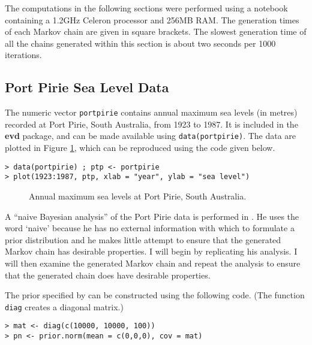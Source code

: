 \documentclass[11pt,a4paper]{article}
\begin{document}
The computations in the following sections were performed using a notebook containing a 1.2GHz Celeron processor and 256MB RAM.
The generation times of each Markov chain are given in square brackets.
The slowest generation time of all the chains generated within this section is about two seconds per 1000 iterations.   

\subsection{Port Pirie Sea Level Data}
\label{egpirie}

The numeric vector \verb+portpirie+ contains annual maximum sea levels (in metres) recorded at Port Pirie, South Australia, from 1923 to 1987.
It is included in the \textbf{evd} package, and can be made available using \verb+data(portpirie)+. 
The data are plotted in Figure \ref{piriedata}, which can be reproduced using the code given below.

\begin{verbatim}
> data(portpirie) ; ptp <- portpirie
> plot(1923:1987, ptp, xlab = "year", ylab = "sea level")
\end{verbatim}

\begin{figure}
\begin{center}
\vspace{-1.5cm}
\end{center}
\caption{Annual maximum sea levels at Port Pirie, South Australia.}
\label{piriedata}
\end{figure}

A ``naive Bayesian analysis'' of the Port Pirie data is performed in \citet[][Section 9.1.3]{cole01}.
He uses the word `naive' because he has no external information with which to formulate a prior distribution and he makes little attempt to ensure that the generated Markov chain has desirable properties.
I will begin by replicating his analysis.
I will then examine the generated Markov chain and repeat the analysis to ensure that the generated chain does have desirable properties.

The prior specified by \citet{cole01} can be constructed using the following code. (The function \verb+diag+ creates a diagonal matrix.)

\begin{verbatim}
> mat <- diag(c(10000, 10000, 100))
> pn <- prior.norm(mean = c(0,0,0), cov = mat)
\end{verbatim}
\end{document}
